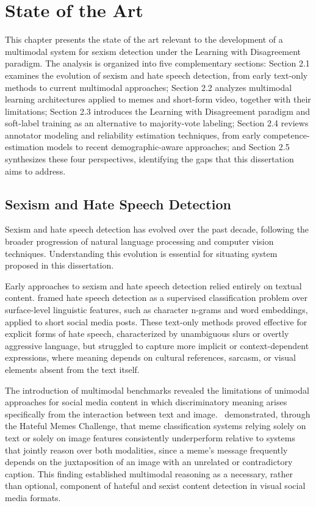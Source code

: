 \chapter{State of the Art}\label{cap:conceptual}

This chapter presents the state of the art relevant to the development of a multimodal
system for sexism detection under the Learning with Disagreement paradigm. The analysis
is organized into five complementary sections: Section 2.1 examines the evolution of
sexism and hate speech detection, from early text-only methods to current multimodal
approaches; Section 2.2 analyzes multimodal learning architectures applied to memes
and short-form video, together with their limitations; Section 2.3 introduces the Learning
with Disagreement paradigm and soft-label training as an alternative to majority-vote
labeling; Section 2.4 reviews annotator modeling and reliability estimation techniques,
from early competence-estimation models to recent demographic-aware approaches; and
Section 2.5 synthesizes these four perspectives, identifying the gaps that this dissertation
aims to address.

\section{Sexism and Hate Speech Detection}\label{sec:sexism-hate-speech-detection}

Sexism and hate speech detection has evolved over the past
decade, following the broader progression of natural language processing and computer
vision techniques. Understanding this evolution is essential for situating system proposed in this dissertation.

Early approaches to sexism and hate speech detection relied entirely on textual content.
\cite{waseem2016hateful} framed hate speech detection as a supervised classification
problem over surface-level linguistic features, such as character n-grams and word
embeddings, applied to short social media posts. These text-only methods proved effective
for explicit forms of hate speech, characterized by unambiguous slurs or overtly aggressive
language, but struggled to capture more implicit or context-dependent expressions, where
meaning depends on cultural references, sarcasm, or visual elements absent from the text
itself.

The introduction of multimodal benchmarks revealed the limitations of unimodal
approaches for social media content in which discriminatory meaning arises specifically
from the interaction between text and image.~\cite{kiela2020hateful} demonstrated, through
the Hateful Memes Challenge, that meme classification systems relying solely on text or
solely on image features consistently underperform relative to systems that jointly reason
over both modalities, since a meme's message frequently depends on the juxtaposition of
an image with an unrelated or contradictory caption. This finding established multimodal
reasoning as a necessary, rather than optional, component of hateful and sexist content
detection in visual social media formats.

